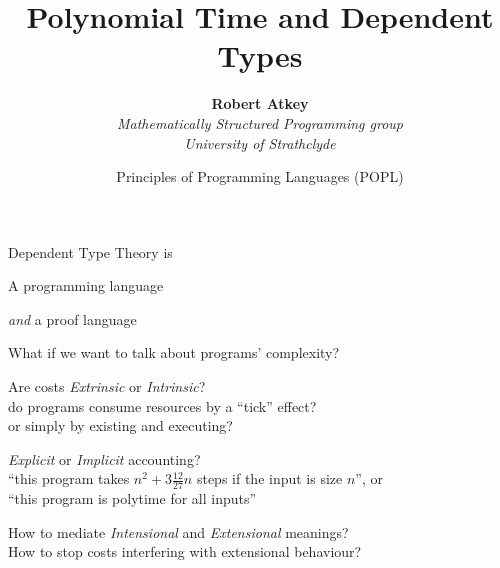 \documentclass[xetex,aspectratio=169,14pt,hyperref={pdfpagelabels=true,pdflang={en-GB}}]{beamer}
\title{Polynomial Time and Dependent Types}
\author{{\bf Robert Atkey} \\
  {\it Mathematically Structured Programming group} \\
  {\it University of Strathclyde} \\
  \mailto{robert.atkey@strath.ac.uk}}
\date{Principles of Programming Languages (POPL)\\ \deemph{19th January 2024}}
\begin{document}
\begin{frame}
\end{frame}

\begin{frame}
  \textcolor{TitleRed}{Dependent Type Theory is}

  \bigskip

  A programming language

  \raggedleft {}

  \raggedright

  \medskip

  {\it and} a proof language

  \raggedleft {}


  \pause \pause
\end{frame}

\newcommand{\comment}[1]{\textcolor{black!60}{#1}}
\newcommand{\hl}[1]{\textcolor{TitleRed}{\it #1}}

\begin{frame}
  What if we want to talk about programs' complexity?
\end{frame}

\begin{frame}

  Are costs \hl{Extrinsic} or \hl{Intrinsic}? \\
  \qquad \comment{do programs consume resources by a ``tick'' effect?} \\
  \qquad \comment{or simply by existing and executing?}

  \bigskip

  \hl{Explicit} or \hl{Implicit} accounting? \\
  \qquad \comment{``this program takes $n^2+3\frac{12}{27}n$ steps if the input is size $n$'', or} \\
  \qquad \comment{``this program is polytime for all inputs''}

  \bigskip

  How to mediate \hl{Intensional} and \hl{Extensional} meanings? \\
  \qquad \comment{How to stop costs interfering with extensional behaviour?}
\end{frame}
\end{document}
